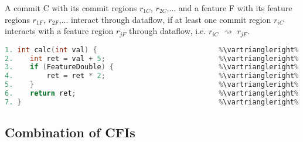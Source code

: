 \begin{definition}\label{def:dataflow_cfi}
A commit C with its commit regions $r_{1C}$, $r_{2C}$,... and a feature F with its feature regions $r_{1F}$, $r_{2F}$,... interact through dataflow, if at least one commit region $r_{iC}$ interacts with a feature region $r_{jF}$ through dataflow, i.e. $r_{iC}$ $\rightsquigarrow$ $r_{jF}$.
\end{definition}

\clearpage

\begin{lstlisting}[language=C++, caption={This code example contains both structural as well as dataflow-based commit feature interactions.
Commit \texttt{fc3a17d} implements the functionality of \texttt{FeatureDouble} for this function.
It follows that a structural commit-feature interaction can be found between them, as their respective commit and feature regions structurally interact.
Commit \texttt{7edb283} introduces the variable \texttt{ret} that is later used inside the feature region of \texttt{FeatureDouble}. 
This accounts for a commit-feature interaction through dataflow, as data that was produced within a commit region is used as input 
by an instruction belonging to a feature region of \texttt{FeatureDouble} later on in the program.}, label=DescriptiveLabel]	
1. int calc(int val) {                             %\vartriangleright% %\texttt{d93df4a}%
2.    int ret = val + 5;                           %\vartriangleright% %\texttt{7edb283}%
3.    if (FeatureDouble) {                         %\vartriangleright% %\texttt{fc3a17d}%    %\vartriangleright% %FeatureDouble%
4.        ret = ret * 2;                           %\vartriangleright% %\texttt{fc3a17d}%    %\vartriangleright% %FeatureDouble%
5.    }                                            %\vartriangleright% %\texttt{fc3a17d}%    %\vartriangleright% %FeatureDouble%
6.    return ret;                                  %\vartriangleright% %\texttt{d93df4a}%   
7. }                                               %\vartriangleright% %\texttt{d93df4a}%   
\end{lstlisting}

\subsection{Combination of CFIs}\label{sec:combination_cfis}

